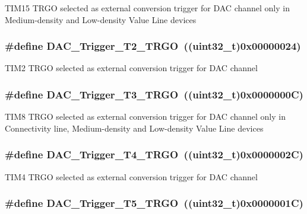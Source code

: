 \label{group__DAC__trigger__selection_ga9f738c0c1366a588ac4fa9e060278c70}
TIM15 TRGO selected as external conversion trigger for DAC channel only in Medium-\/density and Low-\/density Value Line devices \hypertarget{group__DAC__trigger__selection_ga3bfbff1e03af1fd17a57a43e57420fe6}{
\subsubsection[{DAC\_\-Trigger\_\-T2\_\-TRGO}]{\setlength{\rightskip}{0pt plus 5cm}\#define DAC\_\-Trigger\_\-T2\_\-TRGO~((uint32\_\-t)0x00000024)}}
\label{group__DAC__trigger__selection_ga3bfbff1e03af1fd17a57a43e57420fe6}
TIM2 TRGO selected as external conversion trigger for DAC channel \hypertarget{group__DAC__trigger__selection_ga82cbaedc35164c8b9fe0be2faec9b909}{
\subsubsection[{DAC\_\-Trigger\_\-T3\_\-TRGO}]{\setlength{\rightskip}{0pt plus 5cm}\#define DAC\_\-Trigger\_\-T3\_\-TRGO~((uint32\_\-t)0x0000000C)}}
\label{group__DAC__trigger__selection_ga82cbaedc35164c8b9fe0be2faec9b909}
TIM8 TRGO selected as external conversion trigger for DAC channel only in Connectivity line, Medium-\/density and Low-\/density Value Line devices \hypertarget{group__DAC__trigger__selection_ga58ccb2de3d22d66ee975152f5edb330a}{
\subsubsection[{DAC\_\-Trigger\_\-T4\_\-TRGO}]{\setlength{\rightskip}{0pt plus 5cm}\#define DAC\_\-Trigger\_\-T4\_\-TRGO~((uint32\_\-t)0x0000002C)}}
\label{group__DAC__trigger__selection_ga58ccb2de3d22d66ee975152f5edb330a}
TIM4 TRGO selected as external conversion trigger for DAC channel \hypertarget{group__DAC__trigger__selection_ga35352cebfd1ae8a3d63e374a5d86a85d}{
\subsubsection[{DAC\_\-Trigger\_\-T5\_\-TRGO}]{\setlength{\rightskip}{0pt plus 5cm}\#define DAC\_\-Trigger\_\-T5\_\-TRGO~((uint32\_\-t)0x0000001C)}}
